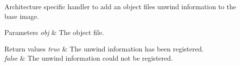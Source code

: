 Architecture specific handler to add an object file\textquotesingle{}s unwind information to the base image.


\begin{DoxyParams}{Parameters}
{\em obj} & The object file. \\
\hline
\end{DoxyParams}

\begin{DoxyRetVals}{Return values}
{\em true} & The unwind information has been registered. \\
\hline
{\em false} & The unwind information could not be registered. \\
\hline
\end{DoxyRetVals}
